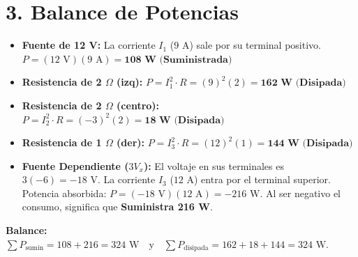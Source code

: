 \documentclass[12pt, a4paper]{article}
\begin{document}
\section*{3. Balance de Potencias}
\begin{itemize}
    \item \textbf{Fuente de 12 V:} La corriente $I_1$ ($9\text{ A}$) sale por su terminal positivo. \\ $P = (12\text{ V})(9\text{ A}) = \textbf{108 W (Suministrada)}$
    \item \textbf{Resistencia de 2 $\Omega$ (izq):} $P = I_1^2 \cdot R = (9)^2(2) = \textbf{162 W (Disipada)}$
    \item \textbf{Resistencia de 2 $\Omega$ (centro):} $P = I_2^2 \cdot R = (-3)^2(2) = \textbf{18 W (Disipada)}$
    \item \textbf{Resistencia de 1 $\Omega$ (der):} $P = I_3^2 \cdot R = (12)^2(1) = \textbf{144 W (Disipada)}$
    \item \textbf{Fuente Dependiente ($3V_x$):} El voltaje en sus terminales es $3(-6) = -18\text{ V}$. La corriente $I_3$ ($12\text{ A}$) entra por el terminal superior. Potencia absorbida: $P = (-18\text{ V})(12\text{ A}) = -216\text{ W}$. Al ser negativo el consumo, significa que \textbf{Suministra 216 W}.
\end{itemize}
\textbf{Balance:} $\sum P_{\text{sumin}} = 108 + 216 = 324\text{ W} \quad \text{y} \quad \sum P_{\text{disipada}} = 162 + 18 + 144 = 324\text{ W}$.
\end{document}
